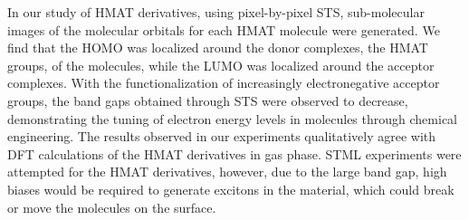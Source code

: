 In our study of HMAT derivatives, using pixel-by-pixel \ac{STS}, sub-molecular images of the molecular orbitals for each HMAT molecule were generated. We find that the HOMO was localized around the donor complexes, the HMAT groups, of the molecules, while the LUMO was localized around the acceptor complexes. With the functionalization of increasingly electronegative acceptor groups, the band gaps obtained through \ac{STS} were observed to decrease, demonstrating the tuning of electron energy levels in molecules through chemical engineering. The results observed in our experiments qualitatively agree with DFT calculations of the HMAT derivatives in gas phase. \ac{STML} experiments were attempted for the HMAT derivatives, however, due to the large band gap, high biases would be required to generate excitons in the material, which could break or move the molecules on the surface.



